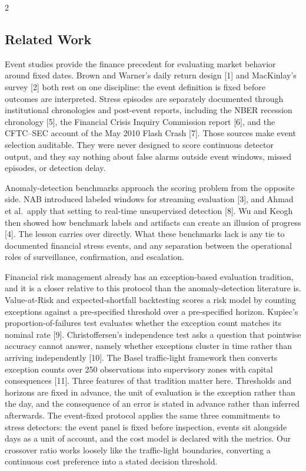 \documentclass{book}
\begin{document}
\begin{multicols}{2}
\subsection{Related Work}
Event studies provide the finance precedent for evaluating market behavior around fixed dates. Brown and Warner's daily return design [1] and MacKinlay's survey [2] both rest on one discipline: the event definition is fixed before outcomes are interpreted. Stress episodes are separately documented through institutional chronologies and post-event reports, including the NBER recession chronology [5], the Financial Crisis Inquiry Commission report [6], and the CFTC--SEC account of the May 2010 Flash Crash [7]. Those sources make event selection auditable. They were never designed to score continuous detector output, and they say nothing about false alarms outside event windows, missed episodes, or detection delay.

Anomaly-detection benchmarks approach the scoring problem from the opposite side. NAB introduced labeled windows for streaming evaluation [3], and Ahmad et al.\ apply that setting to real-time unsupervised detection [8]. Wu and Keogh then showed how benchmark labels and artifacts can create an illusion of progress [4]. The lesson carries over directly. What these benchmarks lack is any tie to documented financial stress events, and any separation between the operational roles of surveillance, confirmation, and escalation.

Financial risk management already has an exception-based evaluation tradition, and it is a closer relative to this protocol than the anomaly-detection literature is. Value-at-Risk and expected-shortfall backtesting scores a risk model by counting exceptions against a pre-specified threshold over a pre-specified horizon. Kupiec's proportion-of-failures test evaluates whether the exception count matches its nominal rate [9]. Christoffersen's independence test asks a question that pointwise accuracy cannot answer, namely whether exceptions cluster in time rather than arriving independently [10]. The Basel traffic-light framework then converts exception counts over 250 observations into supervisory zones with capital consequences [11]. Three features of that tradition matter here. Thresholds and horizons are fixed in advance, the unit of evaluation is the exception rather than the day, and the consequence of an error is stated in advance rather than inferred afterwards. The event-fixed protocol applies the same three commitments to stress detectors: the event panel is fixed before inspection, events sit alongside days as a unit of account, and the cost model is declared with the metrics. Our crossover ratio works loosely like the traffic-light boundaries, converting a continuous cost preference into a stated decision threshold.


\end{multicols}
\end{document}
